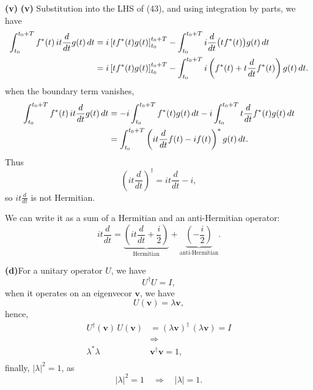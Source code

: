 \documentclass[12pt]{article}
\begin{document}
\pagebreak
\textbf{(v)} \quad \noindent\textbf{(v)}\quad
Substitution into the LHS of (43), and using integration by parts, we have
\begin{align}
\int_{t_0}^{t_0+T} f^*(t)\,it\frac{d}{dt}g(t)\,dt
&= i\left[t f^*(t)g(t)\right]_{t_0}^{t_0+T}
   - \int_{t_0}^{t_0+T} i\frac{d}{dt}\bigl(tf^*(t)\bigr)g(t)\,dt \notag\\
&= i\left[t f^*(t)g(t)\right]_{t_0}^{t_0+T}
   - \int_{t_0}^{t_0+T}
   i\left(f^*(t)+t\frac{d}{dt}f^*(t)\right)g(t)\,dt.
\end{align}
when the boundary term vanishes,
\begin{align}
\int_{t_0}^{t_0+T} f^*(t)\,it\frac{d}{dt}g(t)\,dt
&= -i\int_{t_0}^{t_0+T}f^*(t)g(t)\,dt
   -i\int_{t_0}^{t_0+T}t\frac{d}{dt}f^*(t)g(t)\,dt \notag\\
&= \int_{t_0}^{t_0+T}
   \left(it\frac{d}{dt}f(t)-if(t)\right)^*g(t)\,dt.
\end{align}
Thus
\[
\left(it\frac{d}{dt}\right)^\dagger
=it\frac{d}{dt}-i,
\]
so \(it\frac{d}{dt}\) is not Hermitian.

We can write it as a sum of a Hermitian and an anti-Hermitian operator:
\begin{equation}
it\frac{d}{dt}
=
\underbrace{\left(it\frac{d}{dt}+\frac{i}{2}\right)}_{\text{Hermitian}}
+
\underbrace{\left(-\frac{i}{2}\right)}_{\text{anti-Hermitian}}.
\end{equation}

\smallbreak
\smallbreak
\noindent\textbf{(d)}\quad For a unitary operator $U$, we have
\begin{equation}
    U^{\dagger}U = I,
\end{equation}
when it operates on an eigenvecor $\boldsymbol{v}$, we have
\begin{equation}
    U(\boldsymbol{v}) = \lambda \boldsymbol{v},
\end{equation}
hence,
\begin{equation}
\begin{aligned}
    U^{\dagger}(\boldsymbol{v})\,U(\boldsymbol{v}) &= (\lambda \boldsymbol{v})^{\dagger} \,(\lambda \boldsymbol{v}) = I\\
    &\Longrightarrow\\
    \lambda^* \lambda \, &\boldsymbol{v}^{\dagger} \boldsymbol{v} = 1,\\
\end{aligned}
\end{equation}
finally, $|\lambda|^2 = 1$, as
\begin{equation}
    |\lambda|^2 = 1 \quad \Longrightarrow \quad |\lambda| = 1.
\end{equation}
\end{document}
